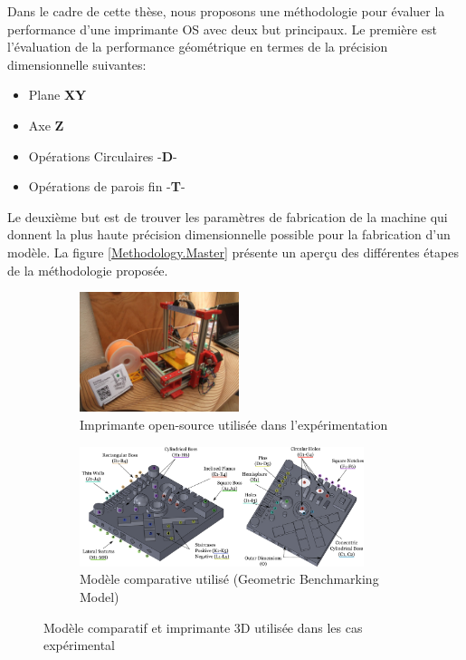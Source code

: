 Dans le cadre de cette thèse, 
nous proposons une méthodologie  pour évaluer la performance d'une imprimante OS avec deux but principaux. 
Le première est l'évaluation  de la performance géométrique en termes de la  précision dimensionnelle suivantes:
% 
\begin{itemize}[noitemsep]
	\item  Plane \textbf{XY}
	\item Axe \textbf{Z}
	\item Opérations Circulaires -\textbf{D}-
	\item Opérations de parois fin -\textbf{T}-
\end{itemize}

Le deuxième but est de trouver les paramètres de fabrication de la machine  qui donnent la plus haute précision dimensionnelle possible pour la fabrication d'un modèle.
La figure \ref{Methodology.Master} présente un aperçu des différentes étapes de la méthodologie proposée. 




\begin{figure}[!t]
	\centering	
		\begin{subfigure}[t]{0.4\textwidth}
		\centering	
		\includegraphics[height=3.5cm]{Figures/Francais/FoldaRap.jpg}	
		\caption[]{Imprimante open-source utilisée dans l'expérimentation}
		\label{Foldarap.Francais}
	\end{subfigure}
	\qquad
\qquad
	\begin{subfigure}[t]{0.4\textwidth}
		\centering	
		\includegraphics[height=3.5cm]{Figures/Francais/GBM.pdf}
		\caption[]{Modèle comparative utilisé (Geometric Benchmarking Model)}
		\label{GBM.Master.Francais}
	\end{subfigure}

	\caption[]{Modèle comparatif et imprimante 3D utilisée dans les cas expérimental}
	\label{Chapter1-Francais}	
\end{figure}

